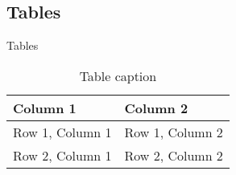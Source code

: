 \subsection{Tables}
\begin{frame}{Tables}
    \begin{table}
        \caption{Table caption}
        \begin{tabular}{ll}
            \toprule
            Column 1 & Column 2\\
            \midrule
            Row 1, Column 1 & Row 1, Column 2\\
            Row 2, Column 1 & Row 2, Column 2\\            
            \bottomrule
        \end{tabular}
    \end{table}
\end{frame}